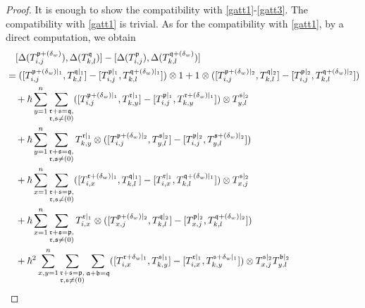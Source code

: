 \documentclass{article}
\theoremstyle{definition}
\theoremstyle{remark}
\numberwithin{equation}{section}
\numberwithin{equation}{section}
\begin{document}
\begin{proof}
It is enough to show the compatibility with \eqref{gatt1}-\eqref{gatt3}. The compatibility with \eqref{gatt1} is trivial. As for the compatibility with \eqref{gatt1}, by a direct computation, we obtain
\begin{align*}
&\quad[\Delta(T^{\mathfrak{p}+(\delta_w)}_{i,j}),\Delta(T^{\mathfrak{q}}_{k,l})]-[\Delta(T^{\mathfrak{p}}_{i,j}),\Delta(T^{\mathfrak{q}+(\delta_w)}_{k,l})]\\
&=([T^{\mathfrak{p}+(\delta_w)|_1}_{i,j},T^{\mathfrak{q}|_1}_{k,l}]-[T^{\mathfrak{p}|_1}_{i,j},T^{\mathfrak{q}+(\delta_w)|_1}_{k,l}])\otimes1+1\otimes ([T^{\mathfrak{p}+(\delta_w)|_2}_{i,j},T^{\mathfrak{q}|_2}_{k,l}]-[T^{\mathfrak{p}|_2}_{i,j},T^{\mathfrak{q}+(\delta_w)|_2}_{k,l}])\\
&\quad+\hbar\sum_{y=1}^n\limits\sum_{\substack{\mathfrak{r}+\mathfrak{s}=\mathfrak{q},\\\mathfrak{r},\mathfrak{s}\neq(0)}}([T^{\mathfrak{p}+(\delta_w)|_1}_{i,j},T^{\mathfrak{r}|_1}_{k,y}]-[T^{\mathfrak{p}|_1}_{i,j},T^{\mathfrak{r}+(\delta_w)|_1}_{k,y}])\otimes T^{\mathfrak{s}|_2}_{y,l}\\
&\quad+\hbar\sum_{y=1}^n\limits\sum_{\substack{\mathfrak{r}+\mathfrak{s}=\mathfrak{q},\\\mathfrak{r},\mathfrak{s}\neq(0)}}T^{\mathfrak{r}|_1}_{k,y}\otimes ([T^{\mathfrak{p}+(\delta_w)|_2}_{i,j},T^{\mathfrak{s}|_2}_{y,l}]-[T^{\mathfrak{p}|_2}_{i,j},T^{\mathfrak{s}+(\delta_w)|_2}_{y,l}])\\
&\quad+\hbar\sum_{x=1}^n\limits\sum_{\substack{\mathfrak{r}+\mathfrak{s}=\mathfrak{p},\\\mathfrak{r},\mathfrak{s}\neq(0)}}([T^{\mathfrak{r}+(\delta_w)|_1}_{i,x},T^{\mathfrak{q}|_1}_{k,l}]-[T^{\mathfrak{r}|_1}_{i,x},T^{\mathfrak{q}+(\delta_w)|_1}_{k,l}])\otimes T^{\mathfrak{s}|_2}_{x,j}\\
&\quad+\hbar\sum_{x=1}^n\limits\sum_{\substack{\mathfrak{r}+\mathfrak{s}=\mathfrak{p},\\\mathfrak{r},\mathfrak{s}\neq(0)}} T^{\mathfrak{r}|_1}_{i,x}\otimes ([T^{\mathfrak{p}+(\delta_w)|_2}_{x,j},T^{\mathfrak{q}|_2}_{k,l}]-[T^{\mathfrak{p}|_2}_{x,j},T^{\mathfrak{q}+(\delta_w)|_2}_{k,l}])\\
&\quad+\hbar^2\sum_{x,y=1}^n\limits\sum_{\substack{\mathfrak{r}+\mathfrak{s}=\mathfrak{p},\\\mathfrak{r},\mathfrak{s}\neq(0)}}\sum_{\substack{\mathfrak{a}+\mathfrak{b}=\mathfrak{q}}}\limits([T^{\mathfrak{r}+\delta_w|_1}_{i,x},T^{\mathfrak{s}|_1}_{k,y}]-[T^{\mathfrak{r}|_1}_{i,x},T^{\mathfrak{s}+\delta_w|_1}_{k,y}])\otimes T^{\mathfrak{s}|_2}_{x,j}T^{\mathfrak{b}|_2}_{y,l}\\

\end{align*}
\end{proof}
\end{document}
